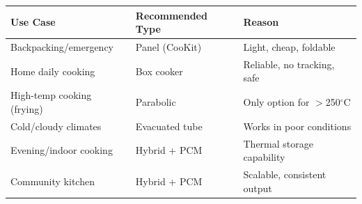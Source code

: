 \documentclass[11pt]{article}
\newcommand{\degC}{$^\circ$C}
\begin{document}
\begin{table}[H]
\centering
\begin{tabular}{lll}
\toprule
\textbf{Use Case} & \textbf{Recommended Type} & \textbf{Reason} \\
\midrule
Backpacking/emergency & Panel (CooKit) & Light, cheap, foldable \\
Home daily cooking & Box cooker & Reliable, no tracking, safe \\
High-temp cooking (frying) & Parabolic & Only option for $>$250\degC \\
Cold/cloudy climates & Evacuated tube & Works in poor conditions \\
Evening/indoor cooking & Hybrid + PCM & Thermal storage capability \\
Community kitchen & Hybrid + PCM & Scalable, consistent output \\
\bottomrule
\end{tabular}
\end{table}
\end{document}
